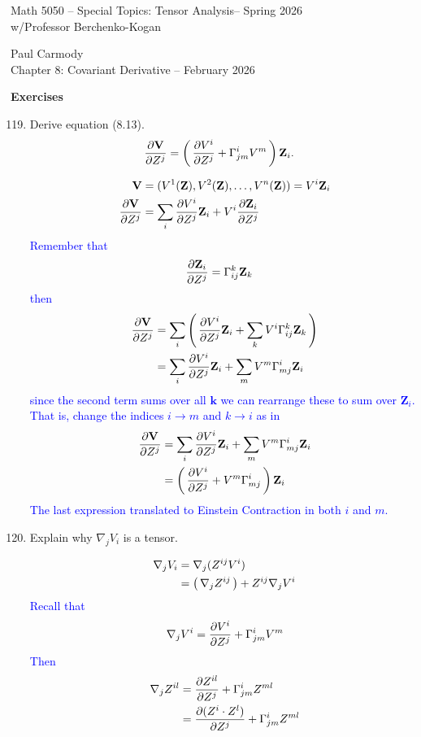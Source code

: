\documentclass[12pt,a4paper]{report}
\newcommand{\CLASSNAME}{Math 5050 -- Special Topics: Tensor Analysis}
\newcommand{\STUDENTNAME}{Paul Carmody}
\newcommand{\ASSIGNMENT}{Chapter 8: Covariant Derivative }
\newcommand{\DUEDATE}{February 2026}
\newcommand{\PROFESSOR}{Professor Berchenko-Kogan}
\newcommand{\SEMESTER}{Spring 2026}
\newcommand{\BLUE}[1]{\textcolor{blue}{#1}}
\newcommand{\COFF}[3]{\Gamma^{#1}_{{#2}{#3}}}
\newcommand{\VK}[1]{\textbf{#1}}
\begin{document}
\begin{center}
	\Large{\CLASSNAME -- \SEMESTER} \\
	\large{ w/\PROFESSOR}
\end{center}
\begin{center}
	\STUDENTNAME \\
	\ASSIGNMENT -- \DUEDATE\\
\end{center} 

\textbf{Exercises}
\begin{enumerate}[label=\textbf{\arabic*.}]
\setcounter{enumi}{118}
\item Derive equation (8.13).
\begin{align*}
	\PART{\VK{V}}{Z^j} &= \PAREN{\PART{V^i}{Z^j}+\COFF{i}{j}{m}V^m}\VK{Z}_i.
\end{align*}

\BLUE{\begin{align*}
	\VK{V} &= (V^1(\VK{Z}), V^2(\VK{Z}), \dots, V^n(\VK{Z})) = V^i\VK{Z}_i  \\
	\PART{\VK{V}}{Z^j} &= \sum_i \PART{V^i}{Z^j}\VK{Z}_i + V^i \PART{\VK{Z}_i}{Z^j} 
\end{align*}Remember that 
\begin{align*}
	\PART{\VK{Z}_i}{Z^j} &= \COFF{k}{i}{j}\VK{Z}_k
\end{align*}then
\begin{align*}
	\PART{\VK{V}}{Z^j} &= \sum_i \PAREN{ \PART{V^i}{Z^j}\VK{Z}_i + \sum_k V^i \COFF{k}{i}{j}\VK{Z}_k } \\
	&= \sum_i\PART{V^i}{Z^j}\VK{Z}_i + \sum_m V^m \COFF{i}{m}{j}\VK{Z}_i 
\end{align*}since the second term sums over all $\VK{k}$ we can rearrange these to sum over $\VK{Z}_i$.  That is, change the indices $i\to m$ and $k \to i$ as in 
\begin{align*}
	\PART{\VK{V}}{Z^j} &= \sum_i\PART{V^i}{Z^j}\VK{Z}_i + \sum_m V^m \COFF{i}{m}{j}\VK{Z}_i \\
	&= \PAREN{\PART{V^i}{Z^j} + V^m \COFF{i}{m}{j}}\VK{Z}_i 
\end{align*}The last expression translated to Einstein Contraction in both $i$ and $m$.
}

\item Explain why $\nabla_jV_i$ is a tensor.

\BLUE{\begin{align*}
	\nabla_jV_i &= \nabla_j(Z^{ij}V^i) \\
		&= \left (\, \nabla_jZ^{ij} \,\right )+Z^{ij}\nabla_jV^i
\end{align*}Recall that
		\begin{align*}
			\nabla_j V^i = \PART{V^i}{Z^j}+\COFF{i}{j}{m}V^m
		\end{align*}Then
		\begin{align*}
			\nabla_jZ^{il} &= \PART{Z^{il}}{Z^j}+\COFF{i}{j}{m}Z^{ml} \\
			&= \PART{(Z^i\cdot Z^l)}{Z^j}+\COFF{i}{j}{m}Z^{ml} \\
		\end{align*}		
}


\end{enumerate}
\end{document}
